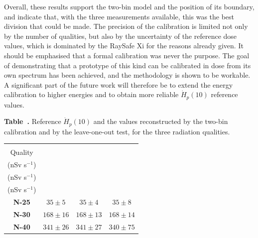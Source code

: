 Overall, these results support the two-bin model and the position of its boundary, and indicate that, with the three measurements available, this was the best division that could be made. The precision of the calibration is limited not only by the number of qualities, but also by the uncertainty of the reference dose values, which is dominated by the RaySafe Xi for the reasons already given. It should be emphasised that a formal calibration was never the purpose. The goal of demonstrating that a prototype of this kind can be calibrated in dose from its own spectrum has been achieved, and the methodology is shown to be workable. A significant part of the future work will therefore be to extend the energy calibration to higher energies and to obtain more reliable $\dot{H}_p(10)$ reference values.

\vspace{1em}
\label{tab:response}
\noindent\textbf{Table~\thetable.} Reference $\dot{H}_p(10)$ and the values reconstructed by the two-bin calibration and by the leave-one-out test, for the three radiation qualities.

\vspace{0.1em}
\begin{table}[H]
  \centering
  \begin{tabular*}{\textwidth}{@{\extracolsep{\fill}}cccc@{}}
    \toprule
    \textbf{\begin{tabular}[b]{@{}c@{}}Radiation\\Quality\end{tabular}} &
    \textbf{\begin{tabular}[b]{@{}c@{}}Reference\\(nSv s$^{-1}$)\end{tabular}} &
    \textbf{\begin{tabular}[b]{@{}c@{}}Calibration\\(nSv s$^{-1}$)\end{tabular}} &
    \textbf{\begin{tabular}[b]{@{}c@{}}Leave-one-out\\(nSv s$^{-1}$)\end{tabular}} \\
    \midrule
    \textbf{N-25} & $35 \pm 5$   & $35 \pm 4$  & $35 \pm 8$ \\
    \textbf{N-30} & $168 \pm 16$ & $168 \pm 13$ & $168 \pm 14$ \\
    \textbf{N-40} & $341 \pm 26$ & $341 \pm 27$ & $340 \pm 75$ \\
    \bottomrule
  \end{tabular*}
\end{table}





